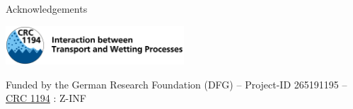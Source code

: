 \documentclass[
	aspectratio=169,%
	color={accentcolor=2d},
	logo=true,%
	colorframetitle=true,%
	]{tudabeamer}
\begin{document}
\begin{frame}{Acknowledgements}

    \vfill
    \begin{center}
        \includegraphics[width=0.5\textwidth]{crc-logo}
    \end{center}
    \begin{center}
        Funded by the German Research Foundation (DFG) – Project-ID 265191195 – \href{https://www.sfb1194.tu-darmstadt.de/index.en.jsp}{CRC 1194} : Z-INF
    \end{center}

\end{frame}
\end{document}
